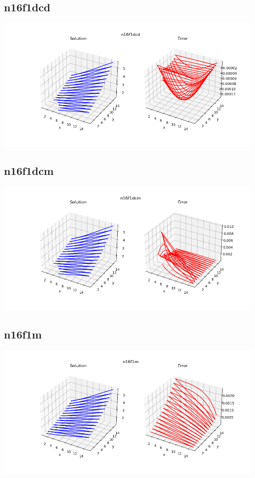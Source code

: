 \subsection*{n16f1dcd}
\includegraphics[scale=0.6]{../../image/n16f1dcd.png}
\subsection*{n16f1dcm}
\includegraphics[scale=0.6]{../../image/n16f1dcm.png}
\subsection*{n16f1m}
\includegraphics[scale=0.6]{../../image/n16f1m.png}
